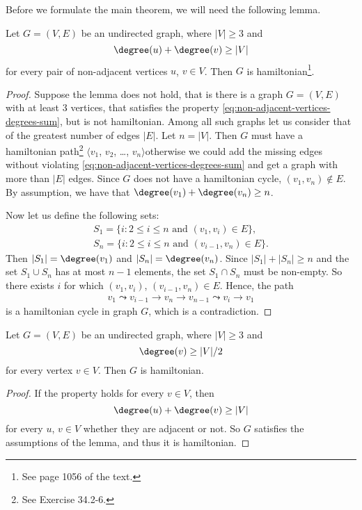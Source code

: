 Before we formulate the main theorem, we will need the following lemma.
\begin{lemma}
    Let $G=(V,E)$ be an undirected graph, where $|V|\ge3$ and
    \begin{equation} \label{eq:non-adjacent-vertices-degrees-sum}
        \degree(u)+\degree(v) \ge |V|
    \end{equation}
    for every pair of non-adjacent vertices $u$, $v\in V$.
    Then $G$ is hamiltonian\footnote{See page 1056 of the text.}.
\end{lemma}

\begin{proof}
    Suppose the lemma does not hold, that is there is a graph $G=(V,E)$ with at least 3 vertices, that satisfies the property \eqref{eq:non-adjacent-vertices-degrees-sum}, but is not hamiltonian.
    Among all such graphs let us consider that of the greatest number of edges $|E|$.
    Let $n=|V|$.
    Then $G$ must have a hamiltonian path\footnote{See Exercise 34.2-6.} $\langle v_1$, $v_2$, \dots, $v_n\rangle$\dash otherwise we could add the missing edges without violating \eqref{eq:non-adjacent-vertices-degrees-sum} and get a graph with more than $|E|$ edges.
    Since $G$ does not have a hamiltonian cycle, $(v_1,v_n)\notin E$.
    By assumption, we have that $\degree(v_1)+\degree(v_n)\ge n$.

    Now let us define the following sets:
    \begin{gather*}
        S_1 = \{i: 2\le i\le n \text{ and } (v_1,v_i)\in E\}, \\
        S_n = \{i: 2\le i\le n \text{ and } (v_{i-1},v_n)\in E\}.
    \end{gather*}
    Then $|S_1|=\degree(v_1)$ and $|S_n|=\degree(v_n)$.
    Since $|S_1|+|S_n|\ge n$ and the set $S_1\cup S_n$ has at most $n-1$ elements, the set $S_1\cap S_n$ must be non-empty.
    So there exists $i$ for which $(v_1,v_i)$, $(v_{i-1},v_n)\in E$.
    Hence, the path
    \begin{align*}
        v_1\leadsto v_{i-1}\to v_n\to v_{n-1}\leadsto v_i\to v_1
    \end{align*}
    is a hamiltonian cycle in graph $G$, which is a contradiction.
\end{proof}

\begin{theorem}
    Let $G=(V,E)$ be an undirected graph, where $|V|\ge3$ and
    \[
        \degree(v) \ge |V|/2
    \]
    for every vertex $v\in V$.
    Then $G$ is hamiltonian.
\end{theorem}

\begin{proof}
    If the property holds for every $v\in V$, then
    \[
        \degree(u)+\degree(v) \ge |V|
    \]
    for every $u$, $v\in V$ whether they are adjacent or not.
    So $G$ satisfies the assumptions of the lemma, and thus it is hamiltonian.
\end{proof}
